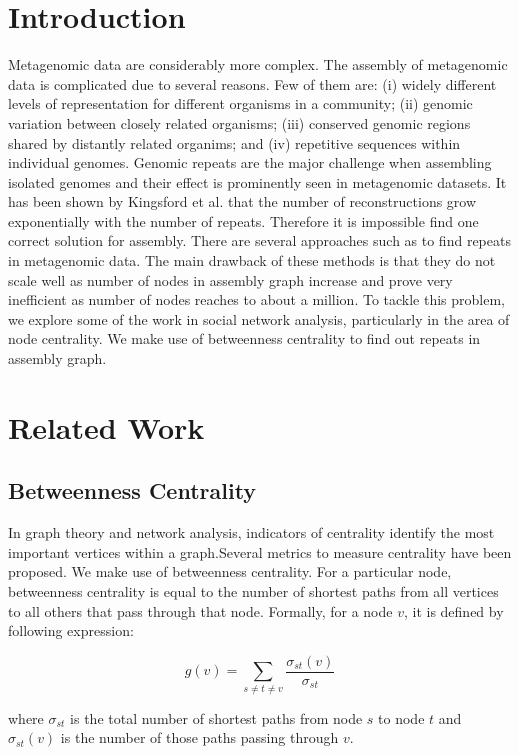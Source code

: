 \documentclass[runningheads,a4paper]{llncs}
\begin{document}
\section{Introduction}

Metagenomic data are considerably more complex. The assembly of metagenomic data is complicated due to several reasons. Few of them are: (i) widely different levels of representation for different organisms in a community; (ii) genomic variation between closely related organisms; (iii) conserved genomic regions shared by distantly related organims; and (iv) repetitive sequences within individual genomes. Genomic repeats are the major challenge when assembling isolated genomes and their effect is prominently seen in metagenomic datasets. It has been shown by Kingsford et al.\cite{kingsford} that the number of reconstructions grow exponentially with the number of repeats. Therefore it is impossible find one correct solution for assembly. There are several approaches such as \cite{bambus} to find repeats in metagenomic data. The main drawback of these methods is that they do not scale well as number of nodes in assembly graph increase and prove very inefficient as number of nodes reaches to about a million. To tackle this problem, we explore some of the work in social network analysis, particularly in the area of node centrality. We make use of betweenness centrality to find out repeats in assembly graph. 

\section{Related Work}

\subsection*{Betweenness Centrality}
In graph theory and network analysis, indicators of centrality identify the most important vertices within a graph.Several metrics to measure centrality have been proposed. We make use of betweenness centrality. For a particular node, betweenness centrality is equal to the number of shortest paths from all vertices to all others that pass through that node. Formally, for a node $v$, it is defined by following expression:

$$g(v) = \sum_{s \neq t \neq v} \frac{\sigma_{st}(v)}{\sigma_{st}}$$

where $\sigma_{st}$ is the total number of shortest paths from node $s$ to node $t$ and $\sigma_{st}(v)$ is the number of those paths passing through $v$.
\end{document}
